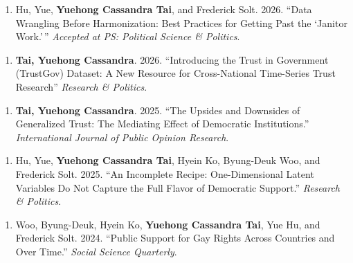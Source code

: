 \documentclass[10.5pt,]{article}
\providecommand{\tightlist}{%
	\setlength{\itemsep}{0pt}\setlength{\parskip}{0pt}}
\renewenvironment{itemize}{
	\begin{list}{}{
			\setlength{\leftmargin}{1.5em}
		}
	}{
	\end{list}
}
\begin{document}
\begin{itemize}
  \begin{itemize}
  \tightlist
  \item
    \begin{enumerate}
    \def\labelenumi{\arabic{enumi}.}
    \setcounter{enumi}{8}
    \tightlist
    \item
      Hu, Yue, \textbf{Yuehong Cassandra Tai}, and Frederick Solt. 2026.
      ``Data Wrangling Before Harmonization: Best Practices for Getting
      Past the `Janitor Work.'\,'' \emph{Accepted at PS: Political
      Science \& Politics}.
    \end{enumerate}
  \item
    \begin{enumerate}
    \def\labelenumi{\arabic{enumi}.}
    \setcounter{enumi}{7}
    \tightlist
    \item
      \textbf{Tai, Yuehong Cassandra}. 2026. ``Introducing the Trust in
      Government (TrustGov) Dataset: A New Resource for Cross-National
      Time-Series Trust Research'' \emph{Research \& Politics}.
    \end{enumerate}
  \item
    \begin{enumerate}
    \def\labelenumi{\arabic{enumi}.}
    \setcounter{enumi}{6}
    \tightlist
    \item
      \textbf{Tai, Yuehong Cassandra}. 2025. ``The Upsides and Downsides
      of Generalized Trust: The Mediating Effect of Democratic
      Institutions.'' \emph{International Journal of Public Opinion
      Research}.
    \end{enumerate}
  \item
    \begin{enumerate}
    \def\labelenumi{\arabic{enumi}.}
    \setcounter{enumi}{5}
    \tightlist
    \item
      Hu, Yue, \textbf{Yuehong Cassandra Tai}, Hyein Ko, Byung-Deuk Woo,
      and Frederick Solt. 2025. ``An Incomplete Recipe: One-Dimensional
      Latent Variables Do Not Capture the Full Flavor of Democratic
      Support.'' \emph{Research \& Politics}.
    \end{enumerate}
  \item
    \begin{enumerate}
    \def\labelenumi{\arabic{enumi}.}
    \setcounter{enumi}{4}
    \tightlist
    \item
      Woo, Byung-Deuk, Hyein Ko, \textbf{Yuehong Cassandra Tai}, Yue Hu,
      and Frederick Solt. 2024. ``Public Support for Gay Rights Across
      Countries and Over Time.'' \emph{Social Science Quarterly}.

\end{enumerate}
\end{itemize}
\end{itemize}
\end{document}
